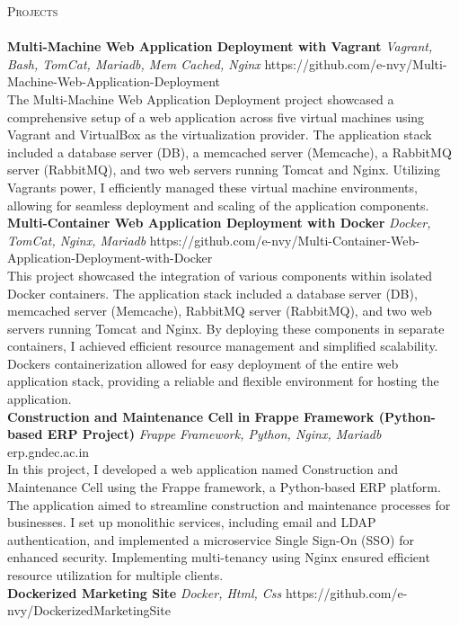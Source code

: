 \documentclass[a4paper]{article}
\newcommand{\lineunder} {
    \vspace*{-8pt} \\
    \hspace*{-18pt} \hrulefill \\
}
\newcommand{\header} [1] {
    {\hspace*{-18pt}\vspace*{6pt} \textsc{#1}}
    \vspace*{-6pt} \lineunder
}
\begin{document}
\header{Projects}
{\textbf{Multi-Machine Web Application Deployment with Vagrant}} {\sl Vagrant, Bash, TomCat, Mariadb, Mem Cached, Nginx} \hfill https://github.com/e-nvy/Multi-Machine-Web-Application-Deployment\\
The Multi-Machine Web Application Deployment project showcased a comprehensive setup of a web application across five virtual machines using Vagrant and VirtualBox as the virtualization provider. The application stack included a database server (DB), a memcached server (Memcache), a RabbitMQ server (RabbitMQ), and two web servers running Tomcat and Nginx. Utilizing Vagrant\textquotesingle{}s power, I efficiently managed these virtual machine environments, allowing for seamless deployment and scaling of the application components.\\
\vspace*{2mm}
{\textbf{Multi-Container Web Application Deployment with Docker}} {\sl Docker, TomCat, Nginx, Mariadb} \hfill https://github.com/e-nvy/Multi-Container-Web-Application-Deployment-with-Docker\\
This project showcased the integration of various components within isolated Docker containers. The application stack included a database server (DB), memcached server (Memcache), RabbitMQ server (RabbitMQ), and two web servers running Tomcat and Nginx. By deploying these components in separate containers, I achieved efficient resource management and simplified scalability. Docker\textquotesingle{}s containerization allowed for easy deployment of the entire web application stack, providing a reliable and flexible environment for hosting the application.\\
\vspace*{2mm}
{\textbf{Construction and Maintenance Cell in Frappe Framework (Python-based ERP Project)}} {\sl Frappe Framework, Python, Nginx, Mariadb} \hfill erp.gndec.ac.in\\
In this project, I developed a web application named \textquotedbl{}Construction and Maintenance Cell\textquotedbl{} using the Frappe framework, a Python-based ERP platform. The application aimed to streamline construction and maintenance processes for businesses. I set up monolithic services, including email and LDAP authentication, and implemented a microservice Single Sign-On (SSO) for enhanced security. Implementing multi-tenancy using Nginx ensured efficient resource utilization for multiple clients.\\
\vspace*{2mm}
{\textbf{Dockerized Marketing Site}} {\sl Docker, Html, Css} \hfill https://github.com/e-nvy/DockerizedMarketingSite\\
\end{document}
